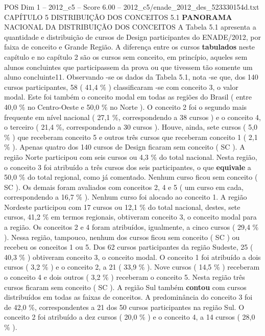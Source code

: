 \begin{textsample}{POS Dim 1 – 2012\_c5 – Score 6.00 – 2012\_c5/enade\_2012\_des\_523330154d.txt}  \label{ex:f1_pos_117}
CAPÍTULO 5 DISTRIBUIÇÃO DOS CONCEITOS 5.1 \textbf{PANORAMA} NACIONAL DA DISTRIBUIÇÃO DOS CONCEITOS A Tabela 5.1 apresenta a quantidade e distribuição de cursos de Design participantes do ENADE/2012, por faixa de conceito e Grande Região.
A diferença entre os cursos \textbf{tabulados} neste capítulo e no capítulo 2 são os cursos sem conceito, em princípio, aqueles sem alunos concluintes que participassem da prova ou que tivessem tão somente um aluno concluinte11.
Observando -se os dados da Tabela 5.1, nota -se que, dos 140 cursos participantes, 58 ( 41,4 \% ) classificaram -se com conceito 3, o valor modal.
Este foi também o conceito modal em todas as regiões do Brasil ( entre 40,0 \% no Centro-Oeste e 50,0 \% no Norte ).
O conceito 2 foi o segundo mais frequente em nível nacional ( 27,1 \%, correspondendo a 38 cursos ) e o conceito 4, o terceiro ( 21,4 \%, correspondendo a 30 cursos ).
Houve, ainda, sete cursos ( 5,0 \% ) que receberam conceito 5 e outros três cursos que receberam conceito 1 ( 2,1 \% ).
Apenas quatro dos 140 cursos de Design ficaram sem conceito ( SC ).
A região Norte participou com seis cursos ou 4,3 \% do total nacional.
Nesta região, o conceito 3 foi atribuído a três cursos dos seis participantes, o que \textbf{equivale} a 50,0 \% do total regional, como já comentado.
Nenhum curso ficou sem conceito ( SC ).
Os demais foram avaliados com conceitos 2, 4 e 5 ( um curso em cada, correspondendo a 16,7 \% ).
Nenhum curso foi alocado ao conceito 1.
A região Nordeste participou com 17 cursos ou 12,1 \% do total nacional, destes, sete cursos, 41,2 \% em termos regionais, obtiveram conceito 3, o conceito modal para a região.
Os conceitos 2 e 4 foram atribuídos, igualmente, a cinco cursos ( 29,4 \% ).
Nessa região, tampouco, nenhum dos cursos ficou sem conceito ( SC ) ou recebeu os conceitos 1 ou 5.
Dos 62 cursos participantes da região Sudeste, 25 ( 40,3 \% ) obtiveram conceito 3, o conceito modal.
O conceito 1 foi atribuído a dois cursos ( 3,2 \% ) e o conceito 2, a 21 ( 33,9 \% ).
Nove cursos ( 14,5 \% ) receberam o conceito 4 e dois outros ( 3,2 \% ) receberam o conceito 5.
Nesta região três cursos ficaram sem conceito ( SC ).
A região Sul também \textbf{contou} com cursos distribuídos em todas as faixas de conceitos.
A predominância do conceito 3 foi de 42,0 \%, correspondentes a 21 dos 50 cursos participantes na região Sul.
O conceito 2 foi atribuído a dez cursos ( 20,0 \% ) e o conceito 4, a 14 cursos ( 28,0 \% ).

\end{textsample}
